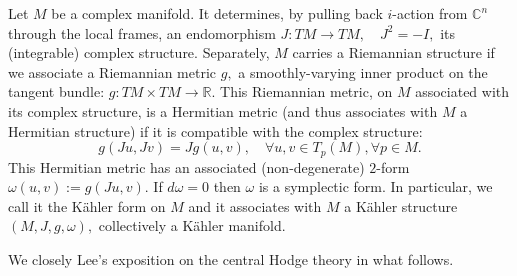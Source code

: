 \begin{definition}
    Let $M$ be a complex manifold. It determines, by pulling back $i$-action from $\mathbb{C}^n$ through the local frames, an endomorphism $J: TM \rightarrow TM, \quad J^2 = -I,$ its (integrable) complex structure.
    Separately, $M$ carries a Riemannian structure if we associate a Riemannian metric $g,$ a smoothly-varying inner product on the tangent bundle: $g: TM \times TM \rightarrow \mathbb{R}.$ This Riemannian metric, on $M$ associated with its complex structure, is a Hermitian metric (and thus associates with $M$ a Hermitian structure) if it is compatible with the complex structure:
    \[
    g(Ju, Jv) = Jg(u,v), \quad \forall u,v\in T_p(M), \forall p\in M.
    \]
    This Hermitian metric has an associated (non-degenerate) $2$-form $\omega(u,v) := g(Ju,v).$ If $d\omega = 0$ then $\omega$ is a symplectic form. In particular, we call it the K\"ahler form on $M$ and it associates with $M$ a K\"ahler structure $(M, J, g, \omega),$ collectively a K\"ahler manifold.
    
\end{definition}

We closely Lee's exposition \cite{LeeCx} on the central Hodge theory in what follows.

